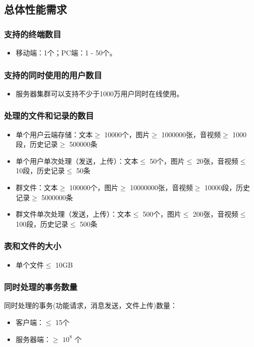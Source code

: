 \subsection{总体性能需求}

\subsubsection{支持的终端数目}
\begin{itemize}
	\item 移动端：1个；PC端：1 - 50个。
\end{itemize}
\subsubsection{支持的同时使用的用户数目}
\begin{itemize}
	\item 服务器集群可以支持不少于1000万用户同时在线使用。
\end{itemize}
\subsubsection{处理的文件和记录的数目}
\begin{itemize}
	\item 单个用户云端存储：文本$\geq$ 10000个，图片$\geq$ 1000000张，音视频$\geq$ 1000段，历史记录$\geq$ 500000条
	\item 单个用户单次处理（发送，上传）：文本$\leq$ 50个，图片$\leq$ 20张，音视频$\leq$ 10段，历史记录$\leq$ 50条
	\item 群文件：文本$\geq$ 100000个，图片$\geq$ 10000000张，音视频$\geq$ 10000段，历史记录$\geq$ 5000000条
	\item 群文件单次处理（发送，上传）：文本$\leq$ 500个，图片$\leq$ 200张，音视频$\leq$ 100段，历史记录$\leq$ 500条
\end{itemize}
\subsubsection{表和文件的大小}
\begin{itemize}
	\item 单个文件$\leq$ 10GB
\end{itemize}
\subsubsection{同时处理的事务数量}
同时处理的事务(功能请求，消息发送，文件上传)数量：
\begin{itemize}
	\item 客户端：$\leq$ 15个
	\item 服务器端：$\geq$ $10^{8}$ 个
\end{itemize}

